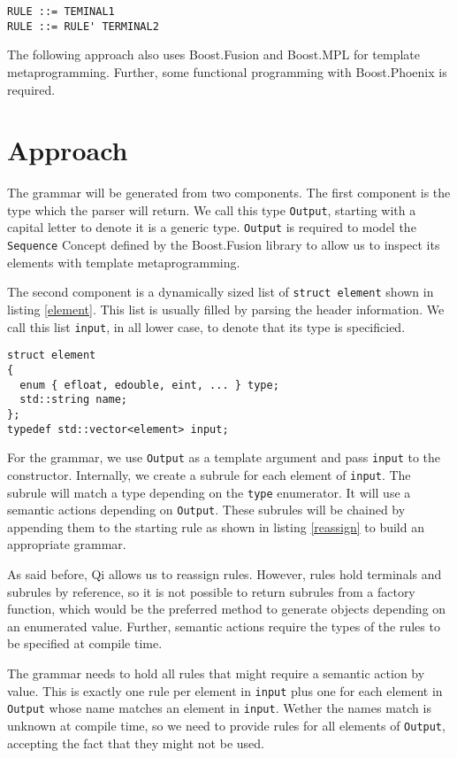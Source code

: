 \documentclass[a4paper,parskip=half,twocolumn]{scrartcl}
\begin{document}
\begin{lstlisting}[frame=tb,label=reassign,caption=reassigning rules]
RULE ::= TEMINAL1
RULE ::= RULE' TERMINAL2
\end{lstlisting}

The following approach also uses Boost.Fusion and Boost.MPL for template
metaprogramming. Further, some functional programming with Boost.Phoenix is
required.

\section{Approach}
The grammar will be generated from two components. The first component is the
type which the parser will return. We call this type \texttt{Output}, starting
with a capital letter to denote it is a generic type. \texttt{Output} is
required to model the \texttt{Sequence} Concept defined by the Boost.Fusion
library to allow us to inspect its elements with template metaprogramming.

The second component is a dynamically sized list of \texttt{struct element}
shown in listing \ref{element}. This list is usually filled by parsing the
header information. We call this list \texttt{input}, in all lower case, to
denote that its type is specificied.

\begin{lstlisting}[frame=tb,label=element,caption=element type]
struct element
{
  enum { efloat, edouble, eint, ... } type; 
  std::string name;
};
typedef std::vector<element> input;
\end{lstlisting}

For the grammar, we use \texttt{Output} as a template argument and pass
\texttt{input} to the constructor. Internally, we create a subrule for each
element of \texttt{input}. The subrule will match a type depending on the
\texttt{type} enumerator. It will use a semantic actions depending on
\texttt{Output}. These subrules will be chained by appending them to the
starting rule as shown in listing \ref{reassign} to build an appropriate
grammar.

As said before, Qi allows us to reassign rules. However, rules hold terminals
and subrules by reference, so it is not possible to return subrules from a
factory function, which would be the preferred method to generate objects
depending on an enumerated value. Further, semantic actions require the types
of the rules to be specified at compile time.

The grammar needs to hold all rules that might require a semantic action by
value. This is exactly one rule per element in \texttt{input} plus one for each
element in \texttt{Output} whose name matches an element in \texttt{input}.
Wether the names match is unknown at compile time, so we need to provide rules
for all elements of \texttt{Output}, accepting the fact that they might not be
used.
\end{document}
